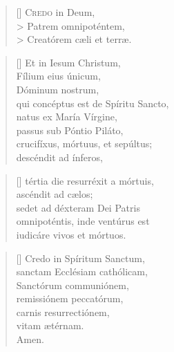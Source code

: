\documentclass[omni.tex]{subfiles}
\begin{document}
\settowidth{\versewidth}{Et ne nos ind\'ucas in tentati\'onem}

\begin{verse}[\versewidth]
\lettrine[lhang=1.0,nindent=0em]{C}{redo} in Deum, \\>
Patrem omnipot\'entem,\\>
Creat\'orem c\ae li et terr\ae .\\
\end{verse}

\begin{verse}[\versewidth]
Et in Iesum Christum, \\
F\'ilium eius \'unicum, \\
D\'ominum nostrum, \\
qui conc\'eptus est de Sp\'iritu Sancto, \\
natus ex Mar\'ia V\'irgine, \\
passus sub P\'ontio Pil\'ato, \\
crucif\'ixus, m\'ortuus, et sep\'ultus; \\
desc\'endit ad \'inferos, \\[3\baselineskip]
\end{verse}
\pagebreak

\poemtitle{ }
\settowidth{\versewidth}{Et ne nos ind\'ucas in tentati\'onem}

\begin{verse}[\versewidth]
t\'ertia die resurr\'exit a m\'ortuis, \\
asc\'endit ad c\ae los; \\
sedet ad d\'exteram Dei Patris \\
omnipot\'entis, inde vent\'urus est \\
iudic\'are vivos et m\'ortuos.
\end{verse}

\begin{verse}[\versewidth]
Credo in Sp\'iritum Sanctum, \\
sanctam Eccl\'esiam cath\'olicam, \\
Sanct\'orum communi\'onem, \\
remissi\'onem peccat\'orum, \\
carnis resurrecti\'onem, \\
vitam \ae t\'ernam. \\
Amen.\\[5\baselineskip]
\end{verse}
\pagebreak
\end{document}
